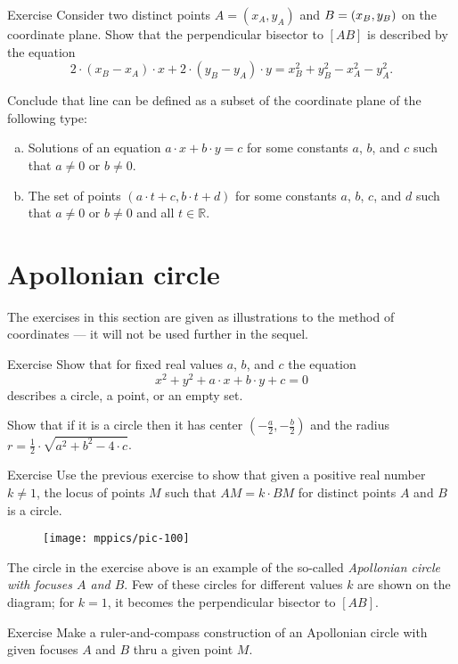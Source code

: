 \begin{thm}{Exercise}\label{ex:line-coord}
Consider two distinct points $A=(x_A,y_A)$ and $B\z=(x_B,y_B)$ on the coordinate plane.
Show that the perpendicular bisector to $[AB]$ is described by the equation
\[2\cdot (x_B-x_A)\cdot x+2\cdot (y_B-y_A)\cdot y=x_B^2+y_B^2-x_A^2-y_A^2.\]

Conclude that line can be defined as a subset of the coordinate plane of the following type:
\begin{enumerate}[(a)]
\item  Solutions of an equation $a\cdot x+b\cdot y=c$
for some constants $a$, $b$, and $c$ such that $a\ne 0$ or $b\ne0$.
\item\label{ex:line-coord:parameter} The set of points $(a\cdot t+c,b\cdot t+d)$ for some constants $a$, $b$, $c$, and $d$ such that $a\ne 0$ or $b\ne0$ and all $t\in \mathbb{R}$.
\end{enumerate}

\end{thm}

\section*{Apollonian circle}

The exercises in this section are given as illustrations to the method of coordinates --- it will not be used further in the sequel.

\begin{thm}{Exercise}\label{ex:circle-coord}
Show that for fixed real values $a$, $b$, and $c$ the equation 
\[x^2+y^2+a\cdot x+b\cdot y+c=0\]
describes a circle, a point, or an empty set.

Show that if it is a circle then it has center $(-\tfrac a2,-\tfrac b2)$ and the radius $r=\tfrac12\cdot \sqrt{a^2+b^2-4\cdot c}$.
\end{thm}

\begin{thm}{Exercise}\label{ex:apolonnius}
Use the previous exercise to show that given a positive real number $k\ne1$,
the locus of points $M$ such that $AM=k\cdot BM$ 
for distinct points $A$ and $B$
is a circle. 
\end{thm}

\begin{figure}[!ht]
\centering
\texttt{[image: mppics/pic-100]}
\end{figure}

The circle in the exercise above is an example of the so-called \emph{Apollonian circle with focuses $A$ and $B$}.
Few of these circles for different values $k$ are shown on the diagram; for $k=1$, it becomes the perpendicular bisector to $[AB]$.


\begin{thm}{Exercise}\label{ex:apolonnius-construction}
Make a ruler-and-compass construction of an Apollonian circle with given focuses $A$ and $B$ thru a given point $M$.
\end{thm}








